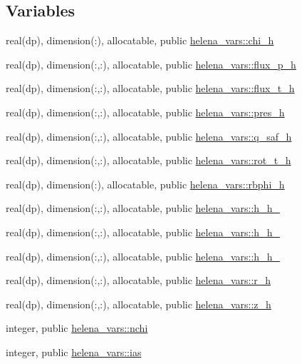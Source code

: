 \subsection*{Variables}
\begin{DoxyCompactItemize}
\item 
real(dp), dimension(\+:), allocatable, public \hyperlink{namespacehelena__vars_aaaa83af362a93836b4dc74bdfa715d1a}{helena\+\_\+vars\+::chi\+\_\+h}
\item 
real(dp), dimension(\+:,\+:), allocatable, public \hyperlink{namespacehelena__vars_ab84791cf288fa3209eafb797479d1e47}{helena\+\_\+vars\+::flux\+\_\+p\+\_\+h}
\item 
real(dp), dimension(\+:,\+:), allocatable, public \hyperlink{namespacehelena__vars_af28db18d415da215cae4d9ec9f60e18b}{helena\+\_\+vars\+::flux\+\_\+t\+\_\+h}
\item 
real(dp), dimension(\+:,\+:), allocatable, public \hyperlink{namespacehelena__vars_a3c258f679dc87684823f378abdc851f0}{helena\+\_\+vars\+::pres\+\_\+h}
\item 
real(dp), dimension(\+:,\+:), allocatable, public \hyperlink{namespacehelena__vars_a95906460e4a767f4dd020100b93a631c}{helena\+\_\+vars\+::q\+\_\+saf\+\_\+h}
\item 
real(dp), dimension(\+:,\+:), allocatable, public \hyperlink{namespacehelena__vars_ae54b26f364e5cc4da39bbb01807e0da1}{helena\+\_\+vars\+::rot\+\_\+t\+\_\+h}
\item 
real(dp), dimension(\+:), allocatable, public \hyperlink{namespacehelena__vars_aff62b635308558649bf727ac93fb7fea}{helena\+\_\+vars\+::rbphi\+\_\+h}
\item 
real(dp), dimension(\+:,\+:), allocatable, public \hyperlink{namespacehelena__vars_acb51f1141d5faeeef88bbf7fc6bab55f}{helena\+\_\+vars\+::h\+\_\+h\+\_}
\item 
real(dp), dimension(\+:,\+:), allocatable, public \hyperlink{namespacehelena__vars_ab3fee13ba0983e009a160324044cb708}{helena\+\_\+vars\+::h\+\_\+h\+\_}
\item 
real(dp), dimension(\+:,\+:), allocatable, public \hyperlink{namespacehelena__vars_a1456485c35bfb60ed2d7f93d611a7b5d}{helena\+\_\+vars\+::h\+\_\+h\+\_}
\item 
real(dp), dimension(\+:,\+:), allocatable, public \hyperlink{namespacehelena__vars_a0d157eace0479c9b8cbd4de9495f9775}{helena\+\_\+vars\+::r\+\_\+h}
\item 
real(dp), dimension(\+:,\+:), allocatable, public \hyperlink{namespacehelena__vars_a41e897edb2a8b34fa7bde28ff57d012a}{helena\+\_\+vars\+::z\+\_\+h}
\item 
integer, public \hyperlink{namespacehelena__vars_a0489f36c6549c35a745ec6d540940d93}{helena\+\_\+vars\+::nchi}
\item 
integer, public \hyperlink{namespacehelena__vars_a009c168bb16124399a6059f7a6107a56}{helena\+\_\+vars\+::ias}
\end{DoxyCompactItemize}
